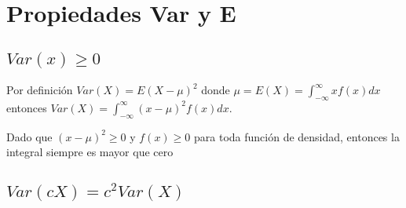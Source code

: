 \section{Propiedades Var y E}
\subsection{$Var(x) \geq 0$}
\begin{Demo}
    Por definición $Var(X) = E(X - \mu)^2$ donde $\mu = E(X) = \int_{-\infty}^{\infty}xf(x)dx$ 
    entonces $Var(X) = \int_{-\infty}^{\infty}(x-\mu)^2 f(x)dx$.

    Dado que $(x-\mu)^2 \geq 0$ y $f(x) \geq 0$ para toda función de densidad, entonces
    la integral siempre es mayor que cero
\end{Demo}
\subsection{$Var(cX) = c^2Var(X)$}
\clearpage
